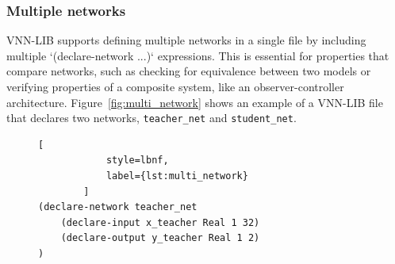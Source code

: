\subsubsection*{Multiple networks}
\label{sec:multi-network-declarations}
VNN-LIB supports defining multiple networks in a single file by including multiple `(declare-network ...)` expressions. This is essential for properties that compare networks, 
such as checking for equivalence between two models or verifying properties of a composite system, like an observer-controller architecture. Figure~\ref{fig:multi_network} 
shows an example of a VNN-LIB file that declares two networks, \texttt{teacher\_net} and \texttt{student\_net}.

\begin{figure}[htbp]
    \begin{minipage}[c]{0.55\textwidth}
        \begin{lstlisting}[
            style=lbnf,
            label={lst:multi_network}
        ]
(declare-network teacher_net
    (declare-input x_teacher Real 1 32)
    (declare-output y_teacher Real 1 2)
)


\end{lstlisting}
\end{minipage}
\end{figure}
